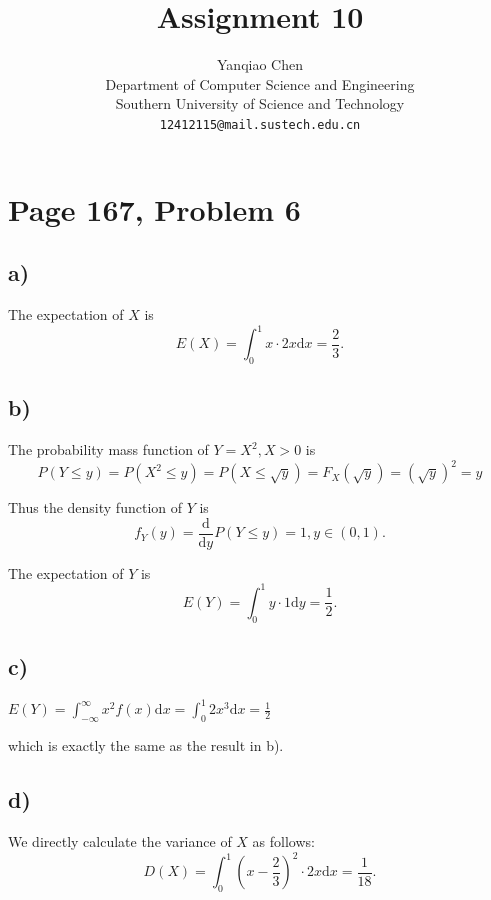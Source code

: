 \documentclass[a4paper, UTF-8]{article}
\theoremstyle{plain}
\begin{document}
\title{\textbf{Assignment 10}}

\author{Yanqiao Chen\\ 
  Department of Computer Science and Engineering\\
  Southern University of Science and Technology\\
  \texttt{12412115@mail.sustech.edu.cn}
  }


\maketitle

\section{Page 167, Problem 6} 

\subsection{a)} 

The expectation of $X$ is 
$$
E(X) = \int_{0}^1 x \cdot 2x \mathrm{d}x = \frac{2}{3}.
$$

\subsection{b)} 

The probability mass function of $Y = X^2, X > 0$ is 
$$
P(Y \leq y) = P(X^2 \leq y) = P(X \leq \sqrt{y}) = F_X(\sqrt{y}) = (\sqrt{y})^2 = y
$$

Thus the density function of $Y$ is
$$
f_Y(y) = \frac{\mathrm{d}}{\mathrm{d}y} P(Y \leq y) = 1, y \in (0, 1).
$$

The expectation of $Y$ is
$$
E(Y) = \int_{0}^1 y \cdot 1 \mathrm{d}y = \frac{1}{2}.
$$

\subsection{c)}

$E(Y) = \int_{-\infty}^\infty x^2 f(x) \mathrm{d} x = \int_{0}^1 2x^3\mathrm{d}x = \frac{1}{2}$ 

which is exactly the same as the result in b).

\subsection{d)}

We directly calculate the variance of $X$ as follows:
$$
D(X) = \int_{0}^1 (x - \frac{2}{3})^2 \cdot 2x \mathrm{d}x = \frac{1}{18}.
$$
\end{document}

